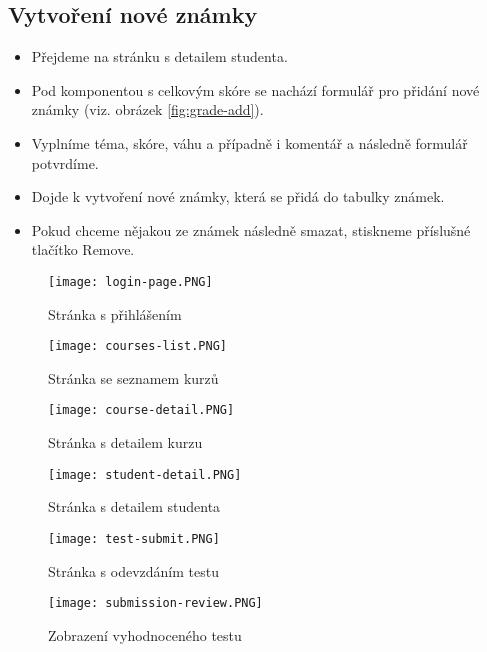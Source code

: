 \subsection{Vytvoření nové známky}
\begin{itemize}
	\item Přejdeme na stránku s detailem studenta.
	\item Pod komponentou s celkovým skóre se nachází formulář pro přidání nové známky (viz. obrázek \ref{fig:grade-add}).
	\item Vyplníme téma, skóre, váhu a případně i komentář a následně formulář potvrdíme.
	\item Dojde k vytvoření nové známky, která se přidá do tabulky známek.
	\item Pokud chceme nějakou ze známek následně smazat, stiskneme příslušné tlačítko Remove.
\end{itemize}

\begin{figure}
	\centering
	\texttt{[image: login-page.PNG]}
	\caption{Stránka s přihlášením}
	\label{fig:login}
\end{figure}

\begin{figure}
	\centering
	\texttt{[image: courses-list.PNG]}
	\caption{Stránka se seznamem kurzů}
	\label{fig:courses-list}
\end{figure}

\begin{figure}
	\centering
	\texttt{[image: course-detail.PNG]}
	\caption{Stránka s detailem kurzu}
	\label{fig:course-detail}
\end{figure}

\begin{figure}
	\centering
	\texttt{[image: student-detail.PNG]}
	\caption{Stránka s detailem studenta}
	\label{fig:student-detail}
\end{figure}

\begin{figure}
	\centering
	\texttt{[image: test-submit.PNG]}
	\caption{Stránka s odevzdáním testu}
	\label{fig:test-submit}
\end{figure}

\begin{figure}
	\centering
	\texttt{[image: submission-review.PNG]}
	\caption{Zobrazení vyhodnoceného testu}
	\label{fig:submission-review}
\end{figure}

